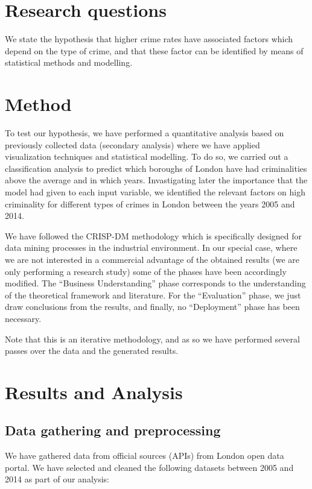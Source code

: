 \documentclass[12pt, openany]{report}
\begin{document}
\section{Research questions}

We state the hypothesis that higher crime rates have associated factors which depend on the type of crime, and that these factor can be identified by means of statistical methods and modelling.


\section{Method}

To test our hypothesis, we have performed a quantitative analysis based on previously collected data (secondary analysis) where we have applied visualization techniques and statistical modelling.
To do so, we carried out a classification analysis to predict which boroughs of London have had criminalities above the average and in which years. Invastigating later the importance that the model had given to each input variable, we identified the relevant factors on high criminality for different types of crimes in London between the years 2005 and 2014.

We have followed the CRISP-DM methodology \cite{shearer00} which is specifically designed for data mining processes in the industrial environment. In our special case, where we are not interested in a commercial advantage of the obtained results (we are only performing a research study) some of the phases have been accordingly modified. The “Business Understanding” phase corresponds to the understanding of the theoretical framework and literature. For the “Evaluation” phase, we just draw conclusions from the results, and finally, no “Deployment” phase has been necessary.

Note that this is an iterative methodology, and as so we have performed several passes over the data and the generated results.

\section{Results and Analysis}


\subsection{Data gathering and preprocessing}

We have gathered data from official sources (APIs) from London open data portal. We have selected and cleaned the following datasets between 2005 and 2014 as part of our analysis:
\end{document}
